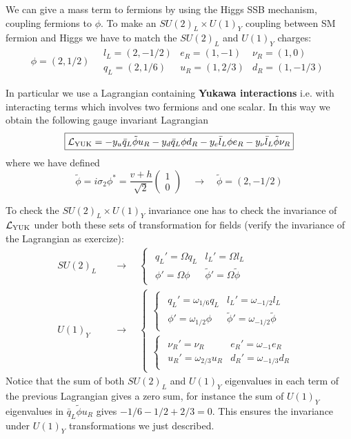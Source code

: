 \documentclass[TheoreticalPhy_ModB.tex]{subfiles}
\begin{document}
We can give a mass term to fermions by using the Higgs SSB mechanism, coupling fermions to $\phi$. To make an $SU(2)_L\times U(1)_Y$ coupling between SM fermion and Higgs we have to match the $SU(2)_L$ and $U(1)_Y$ charges:
\[\phi=(2,1/2)\quad\begin{matrix}l_L=(2,-1/2)&e_R=(1,-1)&\nu_R=(1,0)\\q_L=(2,1/6)&u_R=(1,2/3)&d_R=(1,-1/3)\end{matrix}\]

In particular we use a Lagrangian containing \textbf{Yukawa interactions} i.e. with interacting terms which involves two fermions and one scalar. In this way we obtain the following gauge invariant Lagrangian
\[\boxed{\mathcal L_{\text{YUK}}=-y_u\bar q_L\tilde \phi u_R-y_d\bar q_L\phi d_R-y_e\bar l_L\phi e_R-y_\nu\bar l_L\tilde\phi\nu_R}\]
where we have defined
\[\tilde\phi=i\sigma_2\phi^*=\frac{v+h}{\sqrt2}\begin{pmatrix}1\\0\end{pmatrix}\quad\to\quad\tilde\phi=(2,-1/2)\]


To check the $SU(2)_L\times U(1)_Y$ invariance one has to check the invariance of $\mathcal L_{\text{YUK}}$ under both these sets of transformation for fields (verify the invariance of the Lagrangian as exercize):
\[\begin{aligned}
SU(2)_L\quad&\to\quad\begin{cases}\begin{matrix}q_L'=\Omega q_L&l_L'=\Omega l_L\\\phi'=\Omega\phi&\tilde\phi'=\Omega\tilde\phi\end{matrix}\end{cases}\\
U(1)_Y\quad&\to\quad\begin{cases}\begin{cases}\begin{matrix}q_L'=\omega_{1/6} q_L&l_L'=\omega_{-1/2} l_L\\\phi'=\omega_{1/2}\phi&\tilde\phi'=\omega_{-1/2}\tilde\phi\end{matrix}\end{cases}\\\begin{cases}\begin{matrix}\nu_R'=\nu_R&e_R'=\omega_{-1} e_R\\u_R'=\omega_{2/3}u_R&d_R'=\omega_{-1/3}d_R\end{matrix}\end{cases}\end{cases}
\end{aligned}\]
Notice that the sum of both $SU(2)_L$ and $U(1)_Y$ eigenvalues in each term of the previous Lagrangian gives a zero sum, for instance the sum of $U(1)_Y$ eigenvalues in $\bar q_L\tilde \phi u_R$ gives $-1/6-1/2+2/3=0$. This ensures the invariance under $U(1)_Y$ transformations we just described. 
\end{document}
